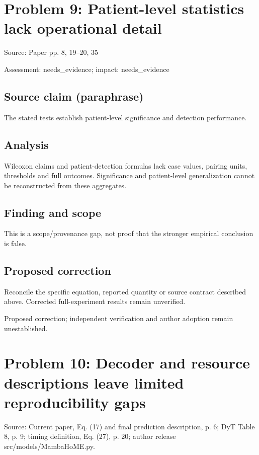 \documentclass[11pt]{article}
\begin{document}
\section*{Problem 9: Patient-level statistics lack operational detail}

Source: Paper pp. 8, 19–20, 35

Assessment: needs\_evidence; impact: needs\_evidence

\subsection*{Source claim (paraphrase)}

The stated tests establish patient-level significance and detection performance.

\subsection*{Analysis}

Wilcoxon claims and patient-detection formulas lack case values, pairing units, thresholds and full outcomes. Significance and patient-level generalization cannot be reconstructed from these aggregates.

\subsection*{Finding and scope}

This is a scope/provenance gap, not proof that the stronger empirical conclusion is false.

\subsection*{Proposed correction}

Reconcile the specific equation, reported quantity or source contract described above. Corrected full-experiment results remain unverified.

Proposed correction; independent verification and author adoption remain unestablished.

\section*{Problem 10: Decoder and resource descriptions leave limited reproducibility gaps}

Source: Current paper, Eq. (17) and final prediction description, p. 6; DyT Table 8, p. 9; timing definition, Eq. (27), p. 20; author release src/models/MambaHoME.py.
\end{document}
